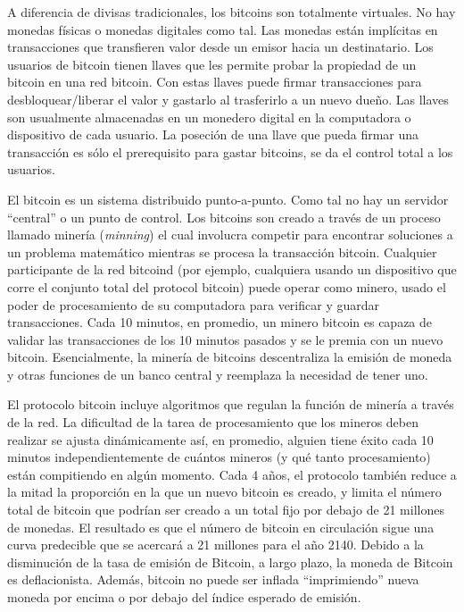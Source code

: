 \documentclass[10pt,journal,compsoc]{IEEEtran}
\begin{document}
A diferencia de divisas tradicionales, los bitcoins son totalmente virtuales. No hay monedas físicas o monedas digitales como tal. Las monedas están implícitas en transacciones que transfieren valor desde un emisor hacia un destinatario. Los usuarios de bitcoin tienen llaves que les permite probar la propiedad de un bitcoin en una red bitcoin. Con estas llaves puede firmar transacciones para desbloquear/liberar el valor y gastarlo al trasferirlo a un nuevo dueño. Las llaves son usualmente almacenadas en un monedero digital en la computadora o dispositivo de cada usuario. La poseción de una llave que pueda firmar una transacción es sólo el prerequisito para gastar bitcoins, se da el control total a los usuarios.

El bitcoin es un sistema distribuido punto-a-punto. Como tal no hay un servidor ``central'' o un punto de control. Los bitcoins son creado a través de un proceso llamado minería (\emph{minning}) el cual involucra competir para encontrar soluciones a un problema matemático mientras se procesa la transacción bitcoin. Cualquier participante de la red bitcoind (por ejemplo, cualquiera usando un dispositivo que corre el conjunto total del protocol bitcoin) puede operar como minero, usado el poder de procesamiento de su computadora para verificar y guardar transacciones. Cada 10 minutos, en promedio, un minero bitcoin es capaza de validar las transacciones de los 10 minutos pasados y se le premia con un nuevo bitcoin. Esencialmente, la minería de bitcoins descentraliza la emisión de moneda y otras funciones de un banco central y reemplaza la necesidad de tener uno.

El protocolo bitcoin incluye algoritmos que regulan la función de minería a través de la red. La dificultad de la tarea de procesamiento que los mineros deben realizar se ajusta dinámicamente así, en promedio, alguien tiene éxito cada 10 minutos independientemente de cuántos mineros (y qué tanto procesamiento) están compitiendo en algún momento. Cada 4 años, el protocolo también reduce a la mitad la proporción en la que un nuevo bitcoin es creado, y limita el número total de bitcoin que podrían ser creado a un total fijo por debajo de 21 millones de monedas. El resultado es que el número de bitcoin en circulación sigue una curva predecible que se acercará a 21 millones para el año 2140. Debido a la disminución de la tasa de emisión de Bitcoin, a largo plazo, la moneda de Bitcoin es deflacionista. Además, bitcoin no puede ser inflada ``imprimiendo'' nueva moneda por encima o por debajo del índice esperado de emisión.
\end{document}
